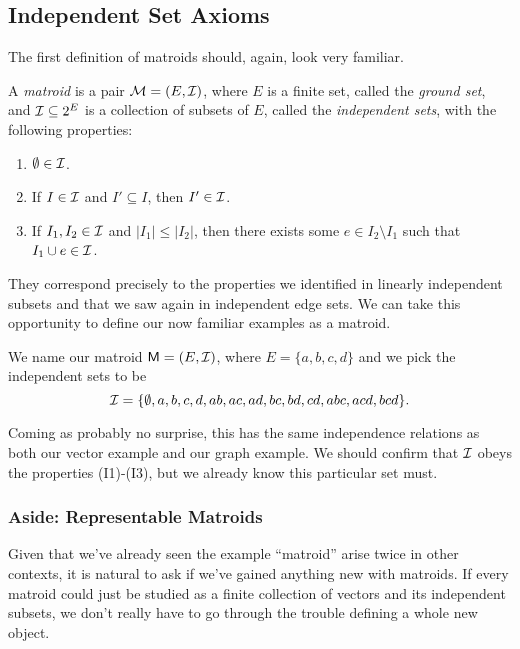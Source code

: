\documentclass[12pt,oneside]{../../sfsuthesis}
\begin{document}
\subsection{Independent Set Axioms}

The first definition of matroids should, again, look very familiar.

\begin{definition}\th\label{def:MatroidIndpendentAxioms}
    A \emph{matroid} is a pair  \( \mathcal{M} = (E, \mathcal{I}) \), where \( E \) is a finite set, called the \emph{ground set}, and \( \mathcal{I} \subseteq 2^E \) is a collection of subsets of \( E \), called the \emph{independent sets}, with the following properties:
    \begin{enumerate}[label=(I\arabic*)]
        \item \( \emptyset \in \mathcal{I} \).
        \item If \( I \in \mathcal{I} \) and \( I' \subseteq I \), then \( I' \in \mathcal{I} \).
        \item If \( I_1, I_2 \in \mathcal{I} \) and \( |I_1| \leq |I_2|\), then there exists some \( e \in I_2 \setminus I_1 \)
              such that \( I_1 \cup e \in \mathcal{I} \).
    \end{enumerate}
\end{definition}

They correspond precisely to the properties we identified in linearly independent subsets and that we saw again in independent edge sets.
We can take this opportunity to define our now familiar examples as a matroid.

We name our matroid \( \mathsf{M} = (E, \mathcal{I}) \), where \( E = \{ a, b, c, d \} \) and we pick the independent sets to be
\[
    \mathcal{I} = \{
    \emptyset,
    a, b, c, d,
    ab, ac, ad, bc, bd, cd,
    abc, acd, bcd
    \}.
\]

Coming as probably no surprise, this has the same independence relations as both our vector example and our graph example.
We should confirm that \( \mathcal{I} \) obeys the properties (I1)-(I3), but we already know this particular set must.


\subsubsection{Aside: Representable Matroids}
Given that we've already seen the example ``matroid'' arise twice in other contexts, it is natural to ask if we've gained anything new with matroids.
If every matroid could just be studied as a finite collection of vectors and its independent subsets, we don't really have to go through the trouble defining a whole new object.
\end{document}
